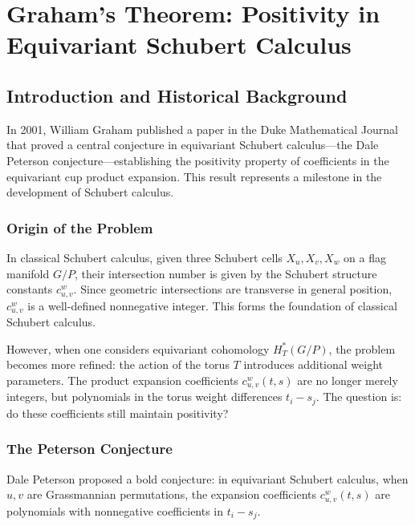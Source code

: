 
\chapter{Graham's Theorem: Positivity in Equivariant Schubert Calculus}
\label{chap:GrahamPositivity}

\section{Introduction and Historical Background}

In 2001, William Graham published a paper in the Duke Mathematical Journal \cite{Gr} that proved a central conjecture in equivariant Schubert calculus---the Dale Peterson conjecture---establishing the positivity property of coefficients in the equivariant cup product expansion. This result represents a milestone in the development of Schubert calculus.

\subsection{Origin of the Problem}

In classical Schubert calculus, given three Schubert cells $X_u, X_v, X_w$ on a flag manifold $G/P$, their intersection number is given by the Schubert structure constants $c_{u,v}^w$. Since geometric intersections are transverse in general position, $c_{u,v}^w$ is a well-defined nonnegative integer. This forms the foundation of classical Schubert calculus.

However, when one considers equivariant cohomology $H_T^*(G/P)$, the problem becomes more refined: the action of the torus $T$ introduces additional weight parameters. The product expansion coefficients $c_{u,v}^w(t,s)$ are no longer merely integers, but polynomials in the torus weight differences $t_i - s_j$. The question is: do these coefficients still maintain positivity?

\subsection{The Peterson Conjecture}

Dale Peterson proposed a bold conjecture: in equivariant Schubert calculus, when $u, v$ are Grassmannian permutations, the expansion coefficients $c_{u,v}^w(t,s)$ are polynomials with nonnegative coefficients in $t_i - s_j$.

